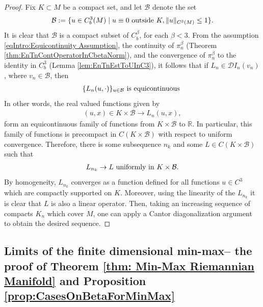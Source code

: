 \documentclass[11pt,reqno]{amsart}
\numberwithin{equation}{section}
\theoremstyle{plain}
\def\D{\mathcal D}
\begin{document}
\begin{proof}
  Fix $K\subset M$ be a compact set, and let $\mathcal{B}$ denote the set
  \begin{align*}
    \mathcal{B} := \{ u \in C^3_{b}(M)  \mid u\equiv 0 \textnormal{ outside } K, \|u\|_{C^3(M)}\leq 1\}.
  \end{align*}	
  It is clear that $\mathcal{B}$ is a compact subset of $C^\beta_b$, for each $\beta<3$. From the assumption \eqref{eqIntro:Equicontinuity Assumption}, the continuity of $\pi_n^\beta$ (Theorem \ref{thm:EnTnContOperatorInCbetaNorm}), and the convergence of $\pi_n^\beta$ to the identity in $C^3_b$ (Lemma \ref{lem:EnTnEstToUInC3}), it follows that if $L_n \in \D I_n(v_n)$, where $v_n \in \mathcal{B}$, then 
  \begin{align*}	
    \{L_{n}(u,\cdot)\}_{u\in \mathcal{B}} \textnormal{ is equicontinuous }   	
  \end{align*}	
  In other words, the real valued functions given by
  \begin{align*}
    (u,x) \in K\times \mathcal{B} \to L_{n}(u,x),	   
  \end{align*}	  
  form an equicontinuous family of functions from $K\times \mathcal{B}$ to $\mathbb{R}$. In particular, this family of functions is precompact in $C(K\times \mathcal{B})$ with respect to uniform convergence. Therefore, there is some subsequence $n_k$ and some $L \in C(K\times \mathcal{B})$ such that
  \begin{align*}
    L_{n_k} \to L \textnormal{ uniformly in } K\times \mathcal{B}.
  \end{align*}
  By homogeneity, $L_{n_k}$ converges as a function defined for all functions $u \in C^3$ which are compactly supported on $K$. Moreover, using the linearity of the $L_{n_k}$ it is clear that $L$ is also a linear operator. Then, taking an increasing sequence of compacts $K_n$ which cover $M$, one can apply a Cantor diagonalization argument to obtain the desired sequence.
\end{proof}




\subsection{Limits of the finite dimensional min-max-- the proof of Theorem \ref{thm: Min-Max Riemannian Manifold} and Proposition \ref{prop:CasesOnBetaForMinMax} }
\end{document}
